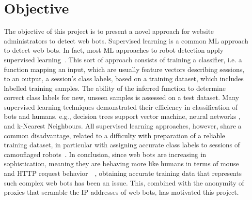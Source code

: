 
\section{Objective}\label{sec:objective}
The objective of this project is to present a novel approach for website administrators to detect web bots.
Supervised learning is a common ML approach to detect web bots.
In fact, most ML approaches to robot detection apply supervised learning~\cite{10.1145/3339252.3339267}.
This sort of approach consists of training a classifier, i.e.
a function mapping an input, which are usually feature vectors describing sessions, to an output, a session’s class labels, based on a training dataset, which includes labelled training samples.
The ability of the inferred function to determine correct class labels for new, unseen samples is assessed on a test dataset.
Many supervised learning techniques demonstrated their efficiency in classification of bots and humans, e.g., decision trees support vector machine, neural networks , and k-Nearest Neighbours.
All supervised learning approaches, however, share a common disadvantage, related to a difficulty with preparation of a reliable training dataset, in particular with assigning accurate class labels to sessions of camouflaged robots~\cite{ROVETTA2020102577}.
In conclusion, since web bots are increasing in sophistication, meaning they are behaving more like humans in terms of mouse and HTTP request behavior~\cite{10.1109/DSN.2013.6575366}~\cite{7371507}, obtaining accurate training data that represents such complex web bots has been an issue.
This, combined with the anonymity of proxies that scramble the IP addresses of web bots, has motivated this project.

